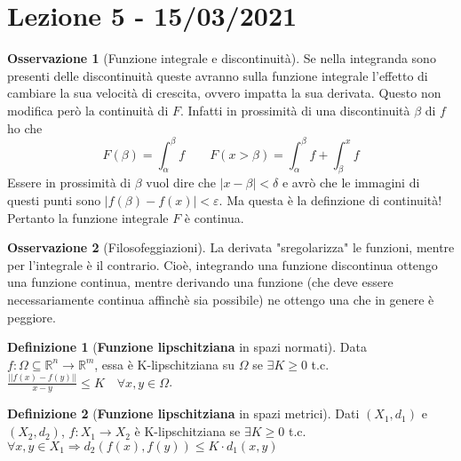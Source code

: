\documentclass{article}
\theoremstyle{definition}
\theoremstyle{definition}
\theoremstyle{definition}
\newtheorem{definition}{Definizione}[section]
\theoremstyle{definition}
\newtheorem{remark}{Osservazione}[section]
\theoremstyle{definition}
\theoremstyle{definition}
\begin{document}
\newpage
\section{Lezione 5 - 15/03/2021}

\begin{remark}[Funzione integrale e discontinuità]
    Se nella integranda sono presenti delle discontinuità queste avranno sulla funzione integrale l'effetto di cambiare la sua velocità di crescita, ovvero impatta la sua derivata. Questo non modifica però la continuità di $F$. Infatti in prossimità di una discontinuità $\beta$ di $f$ ho che
    \[
        F(\beta)=\int_\alpha^\beta f \qquad F(x>\beta) = \int_\alpha^\beta f + \int_\beta^x f
    \]
    Essere in prossimità di $\beta$ vuol dire che $\left|x-\beta\right|<\delta$ e avrò che le immagini di questi punti sono $\left|f(\beta)-f(x)\right|<\varepsilon$. Ma questa è la definzione di continuità! Pertanto la funzione integrale $F$ è continua.
\end{remark}

\begin{remark}[Filosofeggiazioni]
    La derivata "sregolarizza" le funzioni, mentre per l'integrale è il contrario. Cioè, integrando una funzione discontinua ottengo una funzione continua, mentre derivando una funzione (che deve essere necessariamente continua affinchè sia possibile) ne ottengo una che in genere è peggiore.
\end{remark}

\begin{definition}[\textbf{Funzione lipschitziana} in spazi normati]
    Data $f:\Omega \subseteq \mathbb{R}^n \rightarrow \mathbb{R}^m$, essa è K-lipschitziana su $\Omega$ se $\exists K \geq 0$ t.c. $\displaystyle{\frac{\left|\left|f(x)-f(y)\right|\right|}{x-y}\leq K \quad \forall x,y \in\Omega}$.
\end{definition}

\begin{definition}[\textbf{Funzione lipschitziana} in spazi metrici]
    Dati $(X_1,d_1)$ e $(X_2,d_2)$, $f:X_1\rightarrow X_2$ è K-lipschitziana se $\exists K \geq 0$ t.c. $\displaystyle{\forall x,y \in X_1 \Rightarrow d_2(f(x),f(y))\leq K\cdot d_1(x,y)}$ 
\end{definition}
\end{document}
